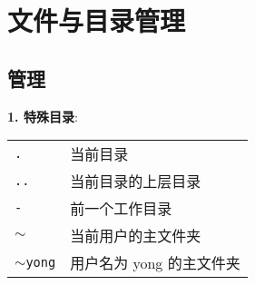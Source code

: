 \section{文件与目录管理}
\subsection{管理}
\par
\textbf{1. 特殊目录}:
\begin{longtable}{l@{ : }p{}}\hline\hline

  \texttt{.} & 当前目录\\

  \texttt{..} & 当前目录的上层目录 \\

  \texttt{-} & 前一个工作目录 \\

  \texttt{$\sim$} & 当前用户的主文件夹 \\

  \texttt{$\sim$yong} & 用户名为 yong 的主文件夹\\

  \hline
\end{longtable}

